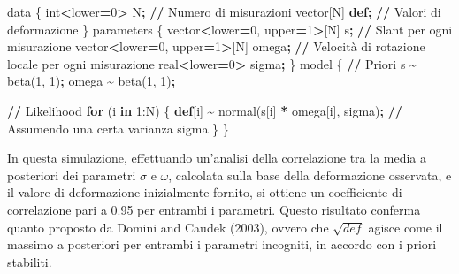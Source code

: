 \documentclass[
  man]{apa6}
\newenvironment{Shaded}{\begin{snugshade}}{\end{snugshade}}
\newcommand{\BuiltInTok}[1]{#1}
\newcommand{\ControlFlowTok}[1]{\textcolor[rgb]{0.13,0.29,0.53}{\textbf{#1}}}
\newcommand{\DecValTok}[1]{\textcolor[rgb]{0.00,0.00,0.81}{#1}}
\newcommand{\KeywordTok}[1]{\textcolor[rgb]{0.13,0.29,0.53}{\textbf{#1}}}
\newcommand{\NormalTok}[1]{#1}
\newcommand{\OperatorTok}[1]{\textcolor[rgb]{0.81,0.36,0.00}{\textbf{#1}}}
\begin{document}
\begin{Shaded}
\begin{Highlighting}[]
\NormalTok{data \{}
  \BuiltInTok{int}\OperatorTok{\textless{}}\NormalTok{lower}\OperatorTok{=}\DecValTok{0}\OperatorTok{\textgreater{}}\NormalTok{ N}\OperatorTok{;}         \OperatorTok{//}\NormalTok{ Numero di misurazioni}
\NormalTok{  vector[N] }\KeywordTok{def}\OperatorTok{;}          \OperatorTok{//}\NormalTok{ Valori di deformazione}
\NormalTok{\}}
\NormalTok{parameters \{}
\NormalTok{  vector}\OperatorTok{\textless{}}\NormalTok{lower}\OperatorTok{=}\DecValTok{0}\NormalTok{, upper}\OperatorTok{=}\DecValTok{1}\OperatorTok{\textgreater{}}\NormalTok{[N] s}\OperatorTok{;}       \OperatorTok{//}\NormalTok{ Slant per ogni misurazione}
\NormalTok{  vector}\OperatorTok{\textless{}}\NormalTok{lower}\OperatorTok{=}\DecValTok{0}\NormalTok{, upper}\OperatorTok{=}\DecValTok{1}\OperatorTok{\textgreater{}}\NormalTok{[N] omega}\OperatorTok{;}   \OperatorTok{//}\NormalTok{ Velocità di rotazione locale per ogni misurazione}
\NormalTok{  real}\OperatorTok{\textless{}}\NormalTok{lower}\OperatorTok{=}\DecValTok{0}\OperatorTok{\textgreater{}}\NormalTok{ sigma}\OperatorTok{;}
\NormalTok{\}}
\NormalTok{model \{}
  \OperatorTok{//}\NormalTok{ Priori}
\NormalTok{  s }\OperatorTok{\textasciitilde{}}\NormalTok{ beta(}\DecValTok{1}\NormalTok{, }\DecValTok{1}\NormalTok{)}\OperatorTok{;}
\NormalTok{  omega }\OperatorTok{\textasciitilde{}}\NormalTok{ beta(}\DecValTok{1}\NormalTok{, }\DecValTok{1}\NormalTok{)}\OperatorTok{;}

  \OperatorTok{//}\NormalTok{ Likelihood}
  \ControlFlowTok{for}\NormalTok{ (i }\KeywordTok{in} \DecValTok{1}\NormalTok{:N) \{}
    \KeywordTok{def}\NormalTok{[i] }\OperatorTok{\textasciitilde{}}\NormalTok{ normal(s[i] }\OperatorTok{*}\NormalTok{ omega[i], sigma)}\OperatorTok{;} \OperatorTok{//}\NormalTok{ Assumendo una certa varianza sigma}
\NormalTok{  \}}
\NormalTok{\}}
\end{Highlighting}
\end{Shaded}

In questa simulazione, effettuando un'analisi della correlazione tra la media a posteriori dei parametri \(\sigma\) e \(\omega\), calcolata sulla base della deformazione osservata, e il valore di deformazione inizialmente fornito, si ottiene un coefficiente di correlazione pari a 0.95 per entrambi i parametri. Questo risultato conferma quanto proposto da Domini and Caudek (2003), ovvero che \(\sqrt{def}\) agisce come il massimo a posteriori per entrambi i parametri incogniti, in accordo con i priori stabiliti.
\end{document}
